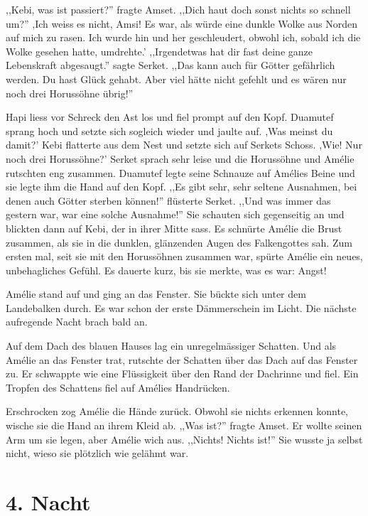\documentclass[11pt,titlepage,a5paper]{book}
\begin{document}
,,Kebi, was ist passiert?'' fragte Amset. ,,Dich haut doch sonst nichts so schnell um?'' ,Ich weiss es nicht, Amsi! Es war, als würde eine dunkle Wolke aus Norden auf mich zu rasen. Ich wurde hin und her geschleudert, obwohl ich, sobald ich die Wolke gesehen hatte, umdrehte.' ,,Irgendetwas hat dir fast deine ganze Lebenskraft abgesaugt.'' sagte Serket. ,,Das kann auch für Götter gefährlich werden. Du hast Glück gehabt. Aber viel hätte nicht gefehlt und es wären nur noch drei Horussöhne übrig!'' 

Hapi liess vor Schreck den Ast los und fiel prompt auf den Kopf. Duamutef sprang hoch und setzte sich sogleich wieder und jaulte auf. ,Was meinst du damit?' Kebi flatterte aus dem Nest und setzte sich auf Serkets Schoss. ,Wie! Nur noch drei Horussöhne?' Serket sprach sehr leise und die Horussöhne und Amélie rutschten eng zusammen. Duamutef legte seine Schnauze auf Amélies Beine und sie legte ihm die Hand auf den Kopf. ,,Es gibt sehr, sehr seltene Ausnahmen, bei denen auch Götter sterben können!'' flüsterte Serket. ,,Und was immer das gestern war, war eine solche Ausnahme!'' Sie schauten sich gegenseitig an und blickten dann auf Kebi, der in ihrer Mitte sass. Es schnürte Amélie die Brust zusammen, als sie in die dunklen, glänzenden Augen des Falkengottes sah. Zum ersten mal, seit sie mit den Horussöhnen zusammen war, spürte Amélie ein neues, unbehagliches Gefühl. Es dauerte kurz, bis sie merkte, was es war: Angst!

Amélie stand auf und ging an das Fenster. Sie bückte sich unter dem Landebalken durch. Es war schon der erste Dämmerschein im Licht. Die nächste aufregende Nacht brach bald an. 

Auf dem Dach des blauen Hauses lag ein unregelmässiger Schatten. Und als Amélie an das Fenster trat, rutschte der Schatten über das Dach auf das Fenster zu. Er schwappte wie eine Flüssigkeit über den Rand der Dachrinne und fiel. Ein Tropfen des Schattens fiel auf Amélies Handrücken.

Erschrocken zog Amélie die Hände zurück. Obwohl sie nichts erkennen konnte, wische sie die Hand an ihrem Kleid ab. ,,Was ist?'' fragte Amset. Er wollte seinen Arm um sie legen, aber Amélie wich aus. ,,Nichts! Nichts ist!'' Sie wusste ja selbst nicht, wieso sie plötzlich wie gelähmt war.

\chapter*{4. Nacht}
\end{document}
